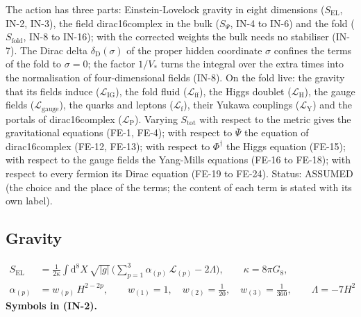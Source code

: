 \documentclass[
  10pt,
]{article}
\begin{document}
The action has three parts: Einstein-Lovelock gravity in eight
dimensions (\(S_{\mathrm{EL}}\), IN-2, IN-3), the field dirac16complex
in the bulk (\(S_\Psi\), IN-4 to IN-6) and the fold
(\(S_{\mathrm{fold}}\), IN-8 to IN-16); with the corrected weights the
bulk needs no stabiliser (IN-7). The Dirac delta
\(\delta_{\mathrm{D}}(\sigma)\) of the proper hidden coordinate
\(\sigma\) confines the terms of the fold to \(\sigma = 0\); the factor
\(1/V_*\) turns the integral over the extra times into the normalisation
of four-dimensional fields (IN-8). On the fold live: the gravity that
its fields induce (\(\mathcal{L}_{\mathrm{IG}}\)), the fold fluid
(\(\mathcal{L}_{\mathrm{ff}}\)), the Higgs doublet
(\(\mathcal{L}_{\mathrm{H}}\)), the gauge fields
(\(\mathcal{L}_{\mathrm{gauge}}\)), the quarks and leptons
(\(\mathcal{L}_{\mathrm{f}}\)), their Yukawa couplings
(\(\mathcal{L}_{\mathrm{Y}}\)) and the portals of dirac16complex
(\(\mathcal{L}_{\mathrm{P}}\)). Varying \(S_{\mathrm{tot}}\) with
respect to the metric gives the gravitational equations (FE-1, FE-4);
with respect to \(\bar\Psi\) the equation of dirac16complex (FE-12,
FE-13); with respect to \(\Phi^\dagger\) the Higgs equation (FE-15);
with respect to the gauge fields the Yang-Mills equations (FE-16 to
FE-18); with respect to every fermion its Dirac equation (FE-19 to
FE-24). Status: ASSUMED (the choice and the place of the terms; the
content of each term is stated with its own label).

\hypertarget{gravity}{%
\subsection{Gravity}\label{gravity}}

\[
\begin{aligned}
S_{\mathrm{EL}} &= \frac{1}{2\kappa}\int\mathrm{d}^8X\,\sqrt{\lvert g\rvert}\,\Big(\sum_{p=1}^{3}\alpha_{(p)}\,\mathcal{L}_{(p)}
 - 2\Lambda\Big),\qquad \kappa = 8\pi G_8,\\
\alpha_{(p)} &= w_{(p)}\,H^{2-2p},\qquad w_{(1)} = 1,\quad w_{(2)} = \frac{1}{20},\quad w_{(3)} = \frac{1}{360},
 \qquad \Lambda = -7H^2
\end{aligned} \tag{IN-2}
\] \textbf{Symbols in (IN-2).}
\end{document}

